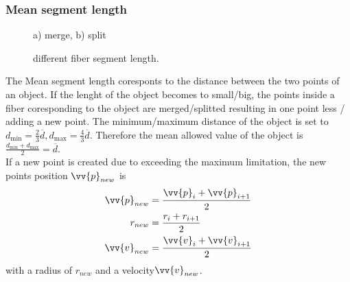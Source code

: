 \subsubsection{Mean segment length}
% 
\begin{figure}[!tb]
    
	\caption{a) merge, b) split}
	\label{fig:merge_split}
\end{figure}
% 
% 
\begin{figure}[!tb]
    \centering
	\caption{different fiber segment length.}
	\label{fig:model_length}
\end{figure}
% 
The Mean segment length coresponts to the distance between the two points of an object. If the lenght of the object becomes to small/big, the points inside a fiber coresponding to the object are merged/splitted resulting in one point less / adding a new point. The minimum/maximum distance of the object is set to $d_{\min} = \frac{2}{3} \overline{d}, d_{\max} = \frac{4}{3}\overline{d}$. Therefore the mean allowed value of the object is $\frac{d_{\min} + d_{\max}}{2} = \overline{d}$. \\
% 
If a new point is created due to exceeding the maximum limitation, the new points position $\vv{p}_{new}$ is 
\begin{align}
\begin{split}
\vv{p}_{new} &= \frac{\vv{p}_{i} + \vv{p}_{i+1}}{2}\\
r_{new} &= \frac{r_{i} + r_{i+1}}{2}\\
\vv{v}_{new} &= \frac{\vv{v}_{i} + \vv{v}_{i+1}}{2}
\end{split}
\end{align}
with a radius of $r_{new}$ and a velocity$\vv{v}_{new}$.
% 
